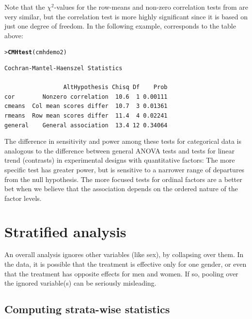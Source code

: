 \documentclass[10pt,krantz2]{krantz}\usepackage[]{graphicx}\usepackage[]{color}
\makeatletter
\newcommand{\hlstd}[1]{\textcolor[rgb]{0.345,0.345,0.345}{#1}}%
\newcommand{\hlkwd}[1]{\textcolor[rgb]{0.737,0.353,0.396}{\textbf{#1}}}%
\newenvironment{kframe}{%
 \def\at@end@of@kframe{}%
 \ifinner\ifhmode%
  \def\at@end@of@kframe{\end{minipage}}%
  \begin{minipage}{\columnwidth}%
 \fi\fi%
 \def\FrameCommand##1{\hskip\@totalleftmargin \hskip-\fboxsep
 \colorbox{shadecolor}{##1}\hskip-\fboxsep
     \hskip-\linewidth \hskip-\@totalleftmargin \hskip\columnwidth}%
 \MakeFramed {\advance\hsize-\width
   \@totalleftmargin\z@ \linewidth\hsize
   \@setminipage}}%
 {\par\unskip\endMakeFramed%
 \at@end@of@kframe}
\newenvironment{knitrout}{}{} %
\renewenvironment{knitrout}{\small\renewcommand{\baselinestretch}{.85}}{} %
\makeatother
\begin{document}


Note that the \(\chi^2\)-values for the row-means and non-zero
correlation tests from 
are very similar, but the correlation test is more
highly significant since it is based on just one degree of
freedom. In the following example,  corresponds to the
table above:
\begin{knitrout}
\color{fgcolor}\begin{kframe}
\begin{alltt}
\hlstd{> }\hlkwd{CMHtest}\hlstd{(cmhdemo2)}
\end{alltt}
\begin{verbatim}
Cochran-Mantel-Haenszel Statistics 

                 AltHypothesis Chisq Df    Prob
cor        Nonzero correlation  10.6  1 0.00111
cmeans  Col mean scores differ  10.7  3 0.01361
rmeans  Row mean scores differ  11.4  4 0.02241
general    General association  13.4 12 0.34064
\end{verbatim}
\end{kframe}
\end{knitrout}
The difference in sensitivity and power among these tests
for categorical data is
analogous to the difference between general ANOVA tests and tests for
linear trend (contrasts)
in experimental designs with quantitative factors:
The more specific test has greater power, but is sensitive to
a narrower range of departures from the null hypothesis.
The more focused tests for ordinal factors are a better bet
when we believe that the association depends on the ordered
nature of the factor levels.

\section{Stratified analysis}\label{sec:twoway-strat}
An overall analysis ignores other variables (like sex), by
collapsing over them.  In the  data,
it is possible that the treatment is effective
only for one gender, or even that the treatment has opposite effects
for men and women.  If so, pooling over the ignored variable(s)
can be seriously misleading.

\subsection{Computing strata-wise statistics}\label{sec:twoway-strata}
\end{document}
